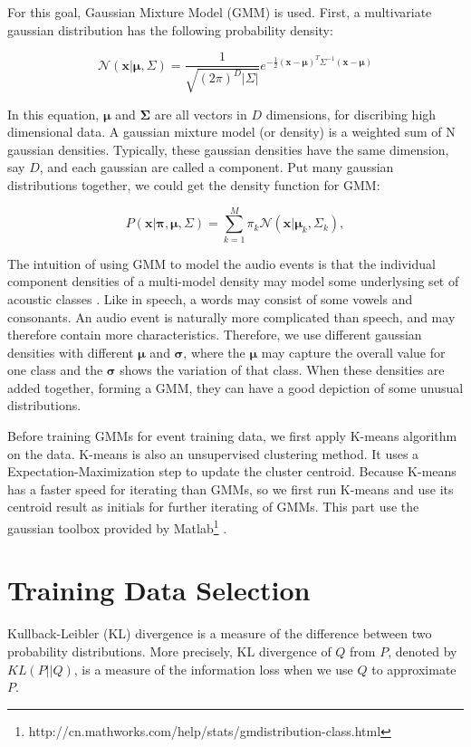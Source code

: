 For this goal, Gaussian Mixture Model (GMM) is used. 
First, a multivariate gaussian distribution has the following probability density:

\begin{equation}
 \mathcal{N}(\mathbf{x}| \mathbf{\mu}, \Sigma) = 
\frac{1}{\sqrt{(2\pi)^D|\Sigma|}}e^{-\frac{1}{2}(\mathbf{x}-\mathbf{\mu})^T \Sigma^{-1} (\mathbf{x}-\mathbf{\mu})}
\end{equation}

In this equation, $\mathbf{\mu}$ and $\mathbf{\Sigma}$ are all vectors in $D$ dimensions, for discribing high dimensional data. 
A gaussian mixture model (or density) is a weighted sum of N gaussian densities. 
Typically, these gaussian densities have the same dimension, say $D$, and each gaussian are called a component.  
Put many gaussian distributions together, we could get the density function for GMM: 

\begin{equation}
P(\mathbf{x}|\mathbf{\pi},\mathbf{\mu},\Sigma) = \sum_{k = 1}^{M} \pi_k
\mathcal{N}(\mathbf{x}|\mathbf{\mu}_k, \Sigma_k),
\end{equation} 

The intuition of using GMM to model the audio events is that the individual component densities of a multi-model density may model some underlysing set of acoustic classes \cite{reynolds1995robust}. 
Like in speech, a words may consist of some vowels and consonants. 
An audio event is naturally more complicated than speech, and may therefore contain more characteristics. 
Therefore, we use different gaussian densities with different $\mathbf{\mu}$ and $\mathbf\sigma$, where the $\mathbf\mu$ may capture the overall value for one class and the $\mathbf\sigma$ shows the variation of that class.  
When these densities are added together, forming a GMM, they can have a good depiction of some unusual distributions. 

Before training GMMs for event training data, we first apply K-means algorithm on the data. 
K-means is also an unsupervised clustering method. 
It uses a Expectation-Maximization step to update the cluster centroid. 
Because K-means has a faster speed for iterating than GMMs, so we first run K-means and use its centroid result as initials for further iterating of GMMs. 
This part use the gaussian toolbox provided by Matlab\footnote{http://cn.mathworks.com/help/stats/gmdistribution-class.html} . 


\section{Training Data Selection}
Kullback-Leibler (KL) divergence is a measure of the difference between two probability distributions. More precisely, KL divergence of $Q$ from $P$, denoted by $KL(P||Q)$, is a measure of the information loss when we use $Q$ to approximate $P$.

